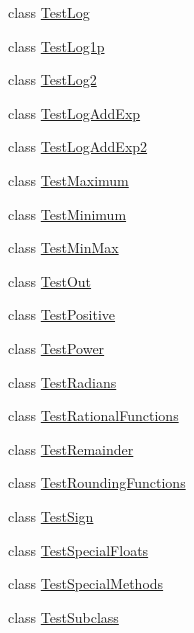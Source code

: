 \begin{DoxyCompactItemize}
\item 
class \hyperlink{classnumpy_1_1core_1_1tests_1_1test__umath_1_1TestLog}{Test\+Log}
\item 
class \hyperlink{classnumpy_1_1core_1_1tests_1_1test__umath_1_1TestLog1p}{Test\+Log1p}
\item 
class \hyperlink{classnumpy_1_1core_1_1tests_1_1test__umath_1_1TestLog2}{Test\+Log2}
\item 
class \hyperlink{classnumpy_1_1core_1_1tests_1_1test__umath_1_1TestLogAddExp}{Test\+Log\+Add\+Exp}
\item 
class \hyperlink{classnumpy_1_1core_1_1tests_1_1test__umath_1_1TestLogAddExp2}{Test\+Log\+Add\+Exp2}
\item 
class \hyperlink{classnumpy_1_1core_1_1tests_1_1test__umath_1_1TestMaximum}{Test\+Maximum}
\item 
class \hyperlink{classnumpy_1_1core_1_1tests_1_1test__umath_1_1TestMinimum}{Test\+Minimum}
\item 
class \hyperlink{classnumpy_1_1core_1_1tests_1_1test__umath_1_1TestMinMax}{Test\+Min\+Max}
\item 
class \hyperlink{classnumpy_1_1core_1_1tests_1_1test__umath_1_1TestOut}{Test\+Out}
\item 
class \hyperlink{classnumpy_1_1core_1_1tests_1_1test__umath_1_1TestPositive}{Test\+Positive}
\item 
class \hyperlink{classnumpy_1_1core_1_1tests_1_1test__umath_1_1TestPower}{Test\+Power}
\item 
class \hyperlink{classnumpy_1_1core_1_1tests_1_1test__umath_1_1TestRadians}{Test\+Radians}
\item 
class \hyperlink{classnumpy_1_1core_1_1tests_1_1test__umath_1_1TestRationalFunctions}{Test\+Rational\+Functions}
\item 
class \hyperlink{classnumpy_1_1core_1_1tests_1_1test__umath_1_1TestRemainder}{Test\+Remainder}
\item 
class \hyperlink{classnumpy_1_1core_1_1tests_1_1test__umath_1_1TestRoundingFunctions}{Test\+Rounding\+Functions}
\item 
class \hyperlink{classnumpy_1_1core_1_1tests_1_1test__umath_1_1TestSign}{Test\+Sign}
\item 
class \hyperlink{classnumpy_1_1core_1_1tests_1_1test__umath_1_1TestSpecialFloats}{Test\+Special\+Floats}
\item 
class \hyperlink{classnumpy_1_1core_1_1tests_1_1test__umath_1_1TestSpecialMethods}{Test\+Special\+Methods}
\item 
class \hyperlink{classnumpy_1_1core_1_1tests_1_1test__umath_1_1TestSubclass}{Test\+Subclass}
\end{DoxyCompactItemize}
